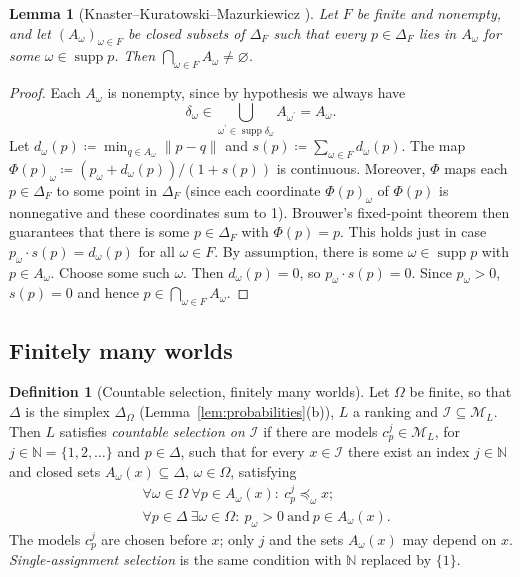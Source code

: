 \documentclass[11pt]{article}
\newtheorem{lemma}[theorem]{Lemma}
\theoremstyle{definition}
\newtheorem{definition}[theorem]{Definition}
\theoremstyle{remark}
\newcommand{\M}{\mathcal M}
\newcommand{\I}{\mathcal I}
\newcommand{\supp}{\operatorname{supp}}
\begin{document}
\begin{lemma}[Knaster--Kuratowski--Mazurkiewicz {\cite{KKM1929}}]\label{lem:kkm}
Let $F$ be finite and nonempty, and let $(A_\omega)_{\omega\in F}$ be closed subsets of $\Delta_F$ such that every $p\in\Delta_F$ lies in $A_\omega$ for some $\omega\in\supp p$. Then $\bigcap_{\omega\in F}A_\omega\ne\varnothing$.
\end{lemma}
\begin{proof}
Each $A_\omega$ is nonempty, since by hypothesis we always have
\[
\delta_\omega\in\bigcup_{\omega^\prime\in\supp \delta_\omega}A_{\omega^\prime}=A_\omega.
\]
Let $d_\omega(p)\coloneqq\min_{q\in A_\omega}\lVert p-q \rVert$ and $s(p)\coloneqq\sum_{\omega\in F} d_\omega(p)$. The map $\Phi(p)_\omega\coloneqq(p_\omega+d_\omega(p))/(1+s(p))$ is continuous. Moreover, $\Phi$ maps each $p\in\Delta_F$ to some point in $\Delta_F$ (since each coordinate $\Phi(p)_\omega$ of $\Phi(p)$ is nonnegative and these coordinates sum to 1). Brouwer's fixed-point theorem then guarantees that there is some $p\in\Delta_F$ with $\Phi(p)=p$. This holds just in case $p_\omega\cdot s(p)=d_\omega(p)$ for all $\omega\in F$. By assumption, there is some $\omega\in\supp p$ with $p\in A_\omega$. Choose some such $\omega$. Then $d_\omega(p)=0$, so $p_\omega\cdot s(p)=0$. Since $p_\omega>0$, $s(p)=0$ and hence $p\in\bigcap_{\omega\in F}A_\omega$.
\end{proof}

\subsection{Finitely many worlds}

\begingroup\color{red}
\begin{definition}[Countable selection, finitely many worlds]\label{def:selection-finite}
Let $\Omega$ be finite, {\color{red}so that $\Delta$ is the simplex $\Delta_\Omega$ (Lemma~\ref{lem:probabilities}(b)),} $L$ a ranking and $\I\subseteq\M_L$. Then $L$ satisfies \emph{countable selection on $\I$} if there are models $c^j_p\in\M_L$, for $j\in\mathbb N=\{1,2,\ldots\}$ and $p\in\Delta$, such that for every $x\in\I$ there exist an index $j\in\mathbb N$ and closed sets $A_\omega(x)\subseteq\Delta$, $\omega\in\Omega$, satisfying
\begin{align}
&\forall\omega\in\Omega\ \forall p\in A_\omega(x):\ c^j_p\preceq_\omega x;\tag{F1}\label{eq:f-comparison}\\
&\forall p\in\Delta\ \exists\omega\in\Omega:\ p_\omega>0\ \text{and}\ p\in A_\omega(x).\tag{F2}\label{eq:f-support}
\end{align}
The models $c^j_p$ are chosen before $x$; only $j$ and the sets $A_\omega(x)$ may depend on $x$. \emph{Single-assignment selection} is the same condition with $\mathbb N$ replaced by $\{1\}$.
\end{definition}
\end{document}
